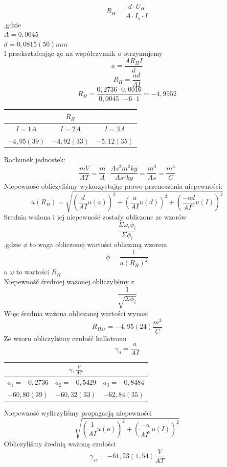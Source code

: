 \documentclass{article}
\begin{document}
$$R_H = \frac{d\cdot U_H}{A\cdot I_s \cdot I}$$
,gdzie \\
$A=0,0045$\\
$d=0,0815(50)mm$\\
I przekształcając go na współczynnik $a$ otrzymujemy
$$a = \frac{AR_HI}{d}$$
$$R_H = \frac{ad}{AI}$$
$$R_H = \frac{0,2736 \cdot 0,0016}{0,0045 \cdot -6 \cdot 1} = -4,9552$$
\begin{center}
    \begin{tabular}{|c|c|c|}\hline 
    \multicolumn{3}{|c|}{$R_H$} \\ \hline
     $I = 1A$ & $I = 2A$ & $I = 3A$ \\ \hline 
$-4,95(39)$ &  $-4,92(33)$ &  $-5,12(35)$ \\ \hline
    \end{tabular}
\end{center}
Rachunek jednostek:
$$\frac{mV}{AT}=\frac{m}{A} \cdot \frac{As^2m^2kg}{As^3kg} = \frac{m^3}{As} = \frac{m^3}{C}$$
Niepewność obliczyliśmy wykorzystując prawo przenoszenia niepewności:
$$u(R_H) = \sqrt{(\frac{d}{AI}u(a))^2 + (\frac{a}{AI}u(d))^2 + (\frac{-ad}{AI^2}u(I))^2}$$
Srednia ważona i jej niepewność zostały obliczone ze wzorów
$$\frac{\Sigma \omega_i \phi_i}{\Sigma \phi_i}$$
,gdzie $\phi$ to waga obliczonej wartości obliczaną wzorem
$$\phi = \frac{1}{u(R_H)^2}$$
a $\omega$ to wartości $R_H$\\
Niepewność średniej ważonej obliczyliśmy z
$$\frac{1}{\sqrt{\Sigma \phi_i}}$$
Więc średnia ważona obliczanej wartości wynosi
$$R_{Hsr} = -4,95(24) \frac{m^3}{C}$$
Ze wzoru obliczyliśmy czułość hallotronu
$$\gamma_0= \frac{a}{AI}$$
\begin{center}
    \begin{tabular}{|c|c|c|}\hline 
    \multicolumn{3}{|c|}{$\gamma, \frac{V}{AT}$} \\ \hline
     $a_1 = -0,2736$ & $a_2 = -0,5429$ & $a_3 = -0,8484$ \\ \hline 
$-60,80(39)$ &  $-60,32(33)$ &  $-62,84(35)$ \\ \hline
    \end{tabular}
\end{center}
Niepewność wyliczyliśmy propagacją niepewności
$$\sqrt{(\frac{1}{AI}u(a))^2 + (\frac{-a}{AI^2}u(I))^2}$$
Obliczyliśmy średnią ważoną czułości
$$\gamma_{sr} = -61,23(1,54) \frac{V}{AT}$$
\end{document}
